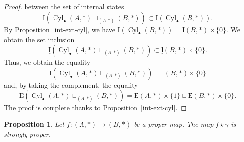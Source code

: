 \documentclass[a4paper,12pt]{amsart}
\newtheorem{prop}[thm]{Proposition}
\begin{document}
\begin{proof}
between the set of internal states
\[\operatorname{\underline{I}}\left(\operatorname{{Cyl}}_\bullet(A,*) \sqcup_{(A,*)}
  (B,*)\right) \subset \operatorname{\underline{I}}(\operatorname{{Cyl}}_\bullet(B,*)).\] By
Proposition~\ref{int-ext-cyl}, we have
$\operatorname{\underline{I}}(\operatorname{{Cyl}}_\bullet(B,*))=\operatorname{\underline{I}}(B,*) \times\{0\}$.  We obtain the set
inclusion
\[\operatorname{\underline{I}}\left(\operatorname{{Cyl}}_\bullet(A,*) \sqcup_{(A,*)}
  (B,*)\right) \subset \operatorname{\underline{I}}(B,*) \times\{0\}.\] Thus, we obtain the
equality
\[\operatorname{\underline{I}}(\operatorname{{Cyl}}_\bullet(A,*) \sqcup_{(A,*)} (B,*)) = \operatorname{\underline{I}}(B,*) \times \{0\}\]
and, by taking the complement, the equality 
\[\operatorname{\underline{E}}(\operatorname{{Cyl}}_\bullet(A,*) \sqcup_{(A,*)} (B,*)) = \operatorname{\underline{E}}(A,*)
\times \{1\} \sqcup \operatorname{\underline{E}}(B,*)\times \{0\}.\] 
The proof is complete thanks to Proposition~\ref{int-ext-cyl}.
\end{proof} 

\begin{prop} \label{ex3} Let $f:(A,*)\to (B,*)$ be a proper map. The map
$f\star \gamma$ is strongly proper. \end{prop}
\end{document}
